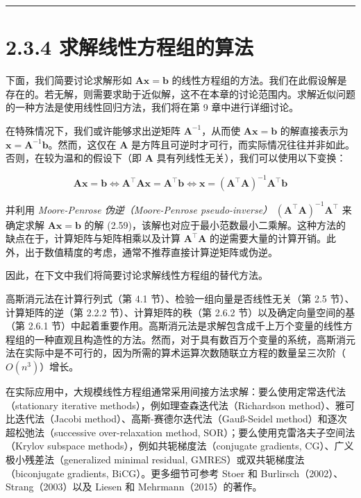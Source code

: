 \medskip\hrule\medskip

\section*{2.3.4 求解线性方程组的算法}

下面，我们简要讨论求解形如 $ \boldsymbol {Ax} = \boldsymbol{b} $ 的线性方程组的方法。我们在此假设解是存在的。若无解，则需要求助于近似解，这不在本章的讨论范围内。求解近似问题的一种方法是使用线性回归方法，我们将在第 9 章中进行详细讨论。

在特殊情况下，我们或许能够求出逆矩阵 $ \boldsymbol{A}^{-1} $，从而使 $ \boldsymbol {Ax} = \boldsymbol{b} $ 的解直接表示为 $ \boldsymbol{x} = \boldsymbol{A}^{-1} \boldsymbol{b} $。然而，这仅在 $ \boldsymbol{A} $ 是方阵且可逆时才可行，而实际情况往往并非如此。否则，在较为温和的假设下（即 $ \boldsymbol{A} $ 具有列线性无关），我们可以使用以下变换：

\begin{equation}
\boldsymbol {Ax} = \boldsymbol{b} \iff \boldsymbol{A}^\top \boldsymbol {Ax} = \boldsymbol{A}^\top \boldsymbol{b} \iff \boldsymbol{x} = (\boldsymbol{A}^\top \boldsymbol{A})^{-1} \boldsymbol{A}^\top \boldsymbol{b}
\tag{2.59}\label{eq:2-59}
\end{equation}

并利用 \emph{Moore-Penrose 伪逆（Moore-Penrose pseudo-inverse）} $ (\boldsymbol{A}^\top \boldsymbol{A})^{-1} \boldsymbol{A}^\top $ 来确定求解 $ \boldsymbol {Ax} = \boldsymbol{b} $ 的解 (2.59)，该解也对应于最小范数最小二乘解。这种方法的缺点在于，计算矩阵与矩阵相乘以及计算 $ \boldsymbol{A}^\top \boldsymbol{A} $ 的逆需要大量的计算开销。此外，出于数值精度的考虑，通常不推荐直接计算逆矩阵或伪逆。

因此，在下文中我们将简要讨论求解线性方程组的替代方法。

高斯消元法在计算行列式（第 4.1 节）、检验一组向量是否线性无关（第 2.5 节）、计算矩阵的逆（第 2.2.2 节）、计算矩阵的秩（第 2.6.2 节）以及确定向量空间的基（第 2.6.1 节）中起着重要作用。高斯消元法是求解包含成千上万个变量的线性方程组的一种直观且构造性的方法。然而，对于具有数百万个变量的系统，高斯消元法在实际中是不可行的，因为所需的算术运算次数随联立方程的数量呈三次阶（$ O(n^3) $）增长。

在实际应用中，大规模线性方程组通常采用间接方法求解：要么使用定常迭代法（stationary iterative methods），例如理查森迭代法（Richardson method）、雅可比迭代法（Jacobi method）、高斯-赛德尔迭代法（Gauß-Seidel method）和逐次超松弛法（successive over-relaxation method, SOR）；要么使用克雷洛夫子空间法（Krylov subspace methods），例如共轭梯度法（conjugate gradients, CG）、广义极小残差法（generalized minimal residual, GMRES）或双共轭梯度法（biconjugate gradients, BiCG）。更多细节可参考 Stoer 和 Burlirsch（2002）、Strang（2003）以及 Liesen 和 Mehrmann（2015）的著作。

